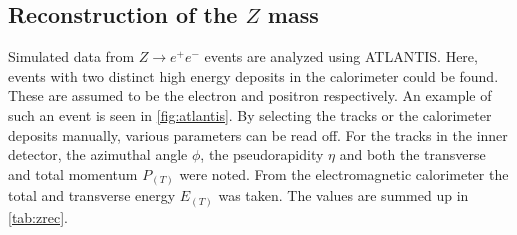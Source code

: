 \documentclass[twoside,        %
               BCOR12mm,       %
               ngerman,english, %
               fleqn,headsepline=false,footsepline=false
              ]{Vorlage/MFPREPORT}
\begin{document}
\subsection{Reconstruction of the $Z$ mass}
Simulated data from $Z\rightarrow e^+e^-$ events are analyzed using ATLANTIS.
Here, events with two distinct  high energy deposits in the calorimeter could
be found. These are assumed to be the electron and positron respectively. An
example of such an event is seen in \cref{fig:atlantis}. By selecting the
tracks or the calorimeter deposits manually, various parameters can be read
off. For the tracks in the inner detector, the azimuthal angle $\phi$, the
pseudorapidity $\eta$ and both the transverse and total momentum $P_{(T)}$ were
noted. From the electromagnetic calorimeter the total and transverse energy
$E_{(T)}$ was taken. The values are summed up in \cref{tab:zrec}.
\end{document}
